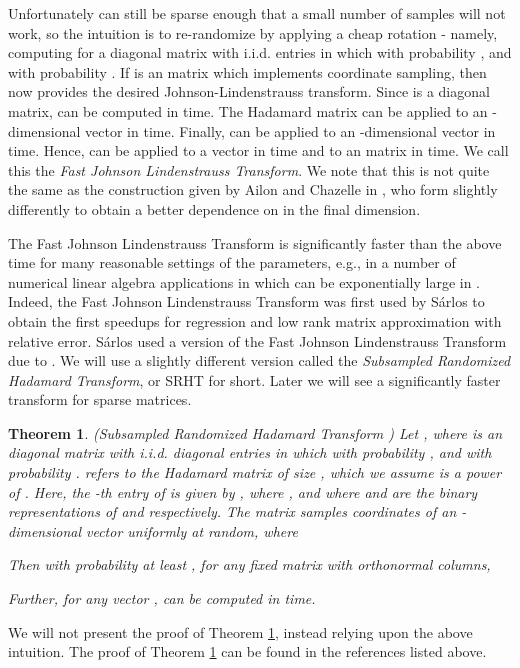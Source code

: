 \documentclass[11pt]{article}
\newtheorem{theorem}{Theorem}
\begin{document}
Unfortunately  can still be sparse enough that a small number of samples will not work, 
so the intuition
is to re-randomize  by applying a cheap rotation - namely, computing  
for a diagonal matrix 
with i.i.d. entries  in which  with probability , 
and  with probability .
If  is an  matrix which implements coordinate sampling, 
then  now provides the desired
Johnson-Lindenstrauss transform. Since  is a diagonal matrix, 
 can be computed in  time. The Hadamard
matrix  can be applied to an -dimensional vector in  time. Finally,  can be applied to
an -dimensional vector in  time. Hence,  
can be applied to a vector in 
time and to an  matrix in  time. 
We call this the {\em Fast Johnson Lindenstrauss Transform}. We note that this is not
quite the same as the construction given by Ailon and Chazelle in \cite{AC06}, who form 
slightly differently to obtain a better dependence on  in the final dimension. 

The Fast Johnson Lindenstrauss Transform 
is significantly faster than the above  time for many
reasonable settings of the parameters, e.g., 
in a number of numerical linear algebra applications in which  can be exponentially
large in . Indeed, the Fast Johnson Lindenstrauss Transform was first used by S\'arlos to obtain the first speedups
for regression and low rank matrix approximation with relative error. S\'arlos used a version of the Fast Johnson
Lindenstrauss Transform due to \cite{AC06}. 
We will use a slightly different version called the {\em Subsampled
Randomized Hadamard Transform}, or SRHT for short. Later we will see a significantly faster transform for sparse
matrices. 

\begin{theorem}\label{thm:srht}(Subsampled Randomized Hadamard Transform 
\cite{AC06,S06,DMM06a,DMMS07,Tro11,DMMW12,ldfu13})
Let , where  
is an  diagonal matrix with i.i.d. diagonal
entries  in which  with probability , and  
with probability . 
 refers to the Hadamard matrix of size , which we assume is a power of . Here, the -th
entry of  is given by , 
where ,
and where  and  are the binary representations of  and
 respectively. The  matrix  samples  coordinates of an -dimensional vector uniformly at random, 
where 
 
Then with probability at least , for any fixed  matrix  with orthonormal columns,
 
Further, for any vector ,  can be computed in  time. 
\end{theorem}
We will not present the proof of Theorem \ref{thm:srht}, instead relying upon the above intuition. The 
proof of Theorem \ref{thm:srht} can be found in the references listed above. 
\end{document}
